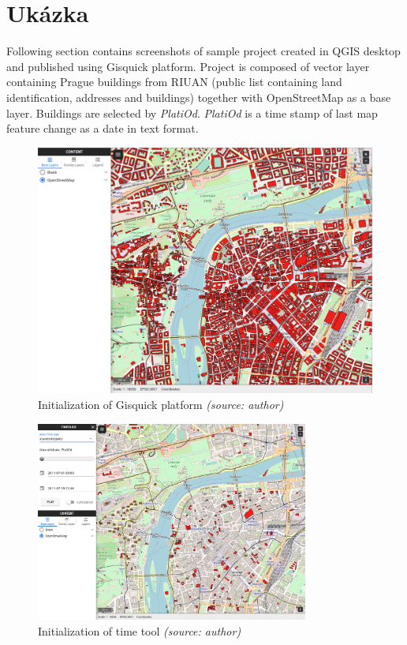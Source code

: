 \newpage
\section{Ukázka}
\label{ssec:aplication}

Following section contains screenshots of sample project created in QGIS 
desktop and published using Gisquick platform. Project is composed of
vector layer containing Prague buildings from RIUAN (public list containing 
land identification, addresses and buildings) together with OpenStreetMap
as a base layer. Buildings are selected by \textit{PlatiOd}. \textit{PlatiOd} 
is a time stamp of last map feature change as a date in text format. 

\bigskip
\begin{figure}[h!]
	\centering
	\includegraphics[width=1\textwidth]{./img/gisquick-open.png}
	\caption{Initialization of Gisquick platform \textit{(source: author)}}
	\label{fig:gisquick-open}
\end{figure}

\newpage

\begin{figure}[h!]
	\centering
	\includegraphics[width=0.8\textwidth]{./img/prague-init.png}
	\caption{Initialization of time tool \textit{(source: author)}}
	\label{fig:prague-init}
\end{figure}


